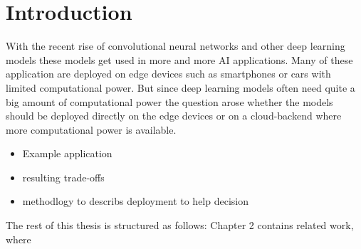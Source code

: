 \chapter{Introduction}
With the recent rise of convolutional neural networks and other deep learning models these models get used in more and more AI applications. Many of these application are deployed on edge devices such as smartphones or cars with limited computational power. But since deep learning models often need quite a big amount of computational power the question arose whether the models should be deployed directly on the edge devices or on a cloud-backend where more computational power is available. 

\begin{itemize}
    \item Example application
    \item resulting trade-offs
    \item methodlogy to describs deployment to help decision
\end{itemize}
The rest of this thesis is structured as follows: Chapter 2 contains related work, where 



\endinput 
